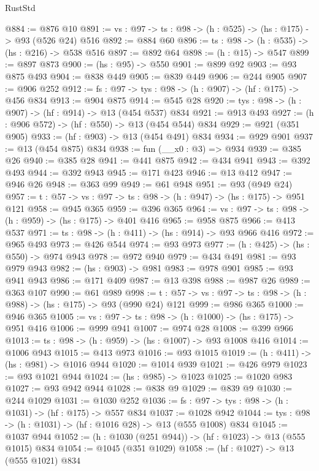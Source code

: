 \begin{lexlean}{RustStd}
\begin{coremodule}
@884 := @876 @10
@891 := {vs : @97} -> {ts : @98} -> (h : @525) -> (hs : @175) -> @93 (@526 @24) @516
@892 := @884 @60
@896 := {ts : @98} -> (h : @535) -> (hs : @216) -> @538 @516
@897 := @892 @64
@898 := (h : @15) -> @547
@899 := @897 @873
@900 := (hs : @95) -> @550
@901 := @899 @92
@903 := @93 @875 @493
@904 := @838 @449
@905 := @839 @449
@906 := @244 @905
@907 := @906 @252
@912 := {fs : @97} -> {tys : @98} -> (h : @907) -> (hf : @175) -> @456 @834
@913 := @904 @875
@914 := @545 @28
@920 := {tys : @98} -> (h : @907) -> (hf : @914) -> @13 (@454 @537) @834
@921 := @913 @493
@927 := (h : @906 @572) -> (hf : @550) -> @13 (@454 @544) @834
@929 := @921 (@351 @905)
@933 := (hf : @903) -> @13 (@454 @491) @834
@934 := @929 @901
@937 := @13 (@454 @875) @834
@938 := fun (__x0 : @3) => @934
@939 := @385 @26
@940 := @385 @28
@941 := @441 @875
@942 := @434 @941
@943 := @392 @493
@944 := @392 @943
@945 := @171 @423
@946 := @13 @412
@947 := @946 @26
@948 := @363 @99
@949 := @61 @948
@951 := @93 (@949 @24)
@957 := {t : @57} -> {vs : @97} -> {ts : @98} -> (h : @947) -> (hs : @175) -> @951 @121
@958 := @945 @365
@959 := @396 @365
@964 := {vs : @97} -> {ts : @98} -> (h : @959) -> (hs : @175) -> @401 @416
@965 := @958 @875
@966 := @413 @537
@971 := {ts : @98} -> (h : @411) -> (hs : @914) -> @93 @966 @416
@972 := @965 @493
@973 := @426 @544
@974 := @93 @973
@977 := (h : @425) -> (hs : @550) -> @974 @943
@978 := @972 @940
@979 := @434 @491
@981 := @93 @979 @943
@982 := (hs : @903) -> @981
@983 := @978 @901
@985 := @93 @941 @943
@986 := @171 @409
@987 := @13 @398
@988 := @987 @26
@989 := @363 @107
@990 := @61 @989
@998 := {t : @57} -> {vs : @97} -> {ts : @98} -> (h : @988) -> (hs : @175) -> @93 (@990 @24) @121
@999 := @986 @365
@1000 := @946 @365
@1005 := {vs : @97} -> {ts : @98} -> (h : @1000) -> (hs : @175) -> @951 @416
@1006 := @999 @941
@1007 := @974 @28
@1008 := @399 @966
@1013 := {ts : @98} -> (h : @959) -> (hs : @1007) -> @93 @1008 @416
@1014 := @1006 @943
@1015 := @413 @973
@1016 := @93 @1015
@1019 := (h : @411) -> (hs : @981) -> @1016 @944
@1020 := @1014 @939
@1021 := @426 @979
@1023 := @93 @1021 @944
@1024 := (hs : @985) -> @1023
@1025 := @1020 @983
@1027 := @93 @942 @944
@1028 := @838 @9
@1029 := @839 @9
@1030 := @244 @1029
@1031 := @1030 @252
@1036 := {fs : @97} -> {tys : @98} -> (h : @1031) -> (hf : @175) -> @557 @834
@1037 := @1028 @942
@1044 := {tys : @98} -> (h : @1031) -> (hf : @1016 @28) -> @13 (@555 @1008) @834
@1045 := @1037 @944
@1052 := (h : @1030 (@251 @944)) -> (hf : @1023) -> @13 (@555 @1015) @834
@1054 := @1045 (@351 @1029)
@1058 := (hf : @1027) -> @13 (@555 @1021) @834

\end{coremodule}
\end{lexlean}
